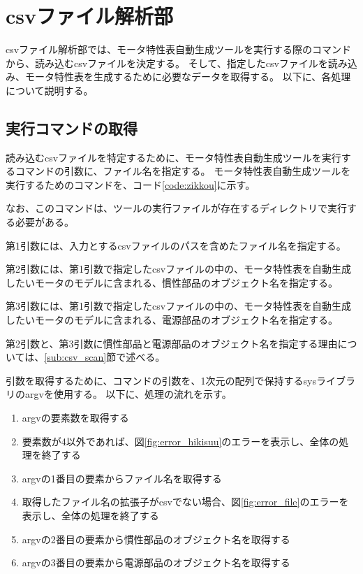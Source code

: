 \section{csvファイル解析部}\label{csv_sec}
csvファイル解析部では、モータ特性表自動生成ツールを実行する際のコマンドから、読み込むcsvファイルを決定する。
そして、指定したcsvファイルを読み込み、モータ特性表を生成するために必要なデータを取得する。
以下に、各処理について説明する。
\subsection{実行コマンドの取得}\label{sub:comand_get}
読み込むcsvファイルを特定するために、モータ特性表自動生成ツールを実行するコマンドの引数に、ファイル名を指定する。
モータ特性表自動生成ツールを実行するためのコマンドを、コード\ref{code:zikkou}に示す。
\begin{figure}[t]
	
\end{figure}
なお、このコマンドは、ツールの実行ファイルが存在するディレクトリで実行する必要がある。

第1引数には、入力とするcsvファイルのパスを含めたファイル名を指定する。

第2引数には、第1引数で指定したcsvファイルの中の、モータ特性表を自動生成したいモータのモデルに含まれる、慣性部品のオブジェクト名を指定する。

第3引数には、第1引数で指定したcsvファイルの中の、モータ特性表を自動生成したいモータのモデルに含まれる、電源部品のオブジェクト名を指定する。

第2引数と、第3引数に慣性部品と電源部品のオブジェクト名を指定する理由については、\ref{sub:csv_scan}節で述べる。

引数を取得するために、コマンドの引数を、1次元の配列で保持するsysライブラリのargvを使用する。
以下に、処理の流れを示す。

\begin{enumerate}
    \item argvの要素数を取得する
    \item 要素数が4以外であれば、図\ref{fig:error_hikisuu}のエラーを表示し、全体の処理を終了する
    \item argvの1番目の要素からファイル名を取得する
    \item 取得したファイル名の拡張子がcsvでない場合、図\ref{fig:error_file}のエラーを表示し、全体の処理を終了する
    \item argvの2番目の要素から慣性部品のオブジェクト名を取得する
    \item argvの3番目の要素から電源部品のオブジェクト名を取得する
\end{enumerate}

